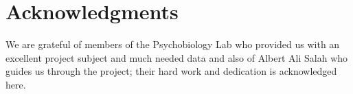 \cleardoublepage
{}
{}
\chapter*{Acknowledgments}
\vspace{1.0in}
We are grateful of members of the Psychobiology Lab who provided us with an excellent project subject and much needed data and also of Albert Ali Salah who guides us through the project; their hard work and dedication is acknowledged here.
